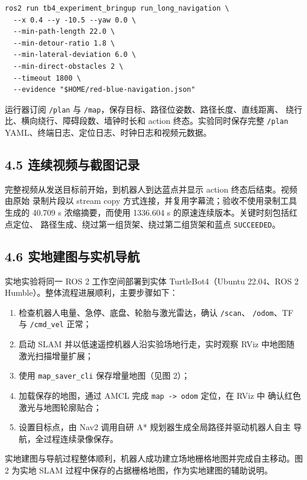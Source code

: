 \documentclass[12pt,a4paper]{ctexart}
\begin{document}
\begin{verbatim}
ros2 run tb4_experiment_bringup run_long_navigation \
  --x 0.4 --y -10.5 --yaw 0.0 \
  --min-path-length 22.0 \
  --min-detour-ratio 1.8 \
  --min-lateral-deviation 6.0 \
  --min-direct-obstacles 2 \
  --timeout 1800 \
  --evidence "$HOME/red-blue-navigation.json"
\end{verbatim}

运行器订阅 \texttt{/plan} 与 \texttt{/map}，保存目标、路径位姿数、路径长度、直线距离、
绕行比、横向绕行、障碍段数、墙钟时长和 action 终态。实验同时保存完整
\texttt{/plan} YAML、终端日志、定位日志、时钟日志和视频元数据。

\subsection*{4.5 连续视频与截图记录}

完整视频从发送目标前开始，到机器人到达蓝点并显示 action 终态后结束。视频由原始
录制片段以 stream copy 方式连接，并复用字幕流；验收不使用录制工具生成的
40.709 s 浓缩摘要，而使用 1336.604 s 的原速连续版本。关键时刻包括红点定位、
路径生成、绕过第一组货架、绕过第二组货架和蓝点 \texttt{SUCCEEDED}。

\subsection*{4.6 实地建图与实机导航}

实地实验将同一 ROS 2 工作空间部署到实体 TurtleBot4（Ubuntu 22.04、ROS 2
Humble）。整体流程进展顺利，主要步骤如下：
\begin{enumerate}[label=\arabic*)]
  \item 检查机器人电量、急停、底盘、轮胎与激光雷达，确认 \texttt{/scan}、
  \texttt{/odom}、TF 与 \texttt{/cmd\_vel} 正常；
  \item 启动 SLAM 并以低速遥控机器人沿实验场地行走，实时观察 RViz 中地图随
  激光扫描增量扩展；
  \item 使用 \texttt{map\_saver\_cli} 保存增量地图（见图 2）；
  \item 加载保存的地图，通过 AMCL 完成 \texttt{map -> odom} 定位，在 RViz 中
  确认红色激光与地图轮廓贴合；
  \item 设置目标点，由 Nav2 调用自研 A* 规划器生成全局路径并驱动机器人自主
  导航，全过程连续录像保存。
\end{enumerate}

实地建图与导航过程整体顺利，机器人成功建立场地栅格地图并完成自主移动。图 2
为实地 SLAM 过程中保存的占据栅格地图，作为实地建图的辅助说明。
\end{document}
